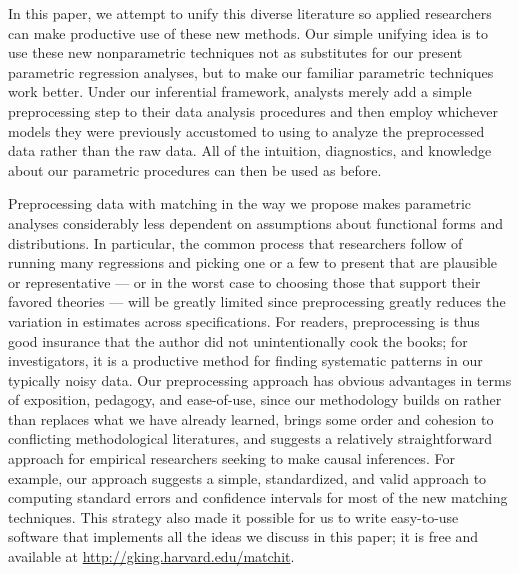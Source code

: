 \documentclass[11pt,titlepage]{article}
\begin{document}
In this paper, we attempt to unify this diverse literature so applied
researchers can make productive use of these new methods.  Our simple
unifying idea is to use these new nonparametric techniques not as
substitutes for our present parametric regression analyses, but to
make our familiar parametric techniques work better.  Under our
inferential framework, analysts merely add a simple preprocessing step
to their data analysis procedures and then employ whichever models
they were previously accustomed to using to analyze the preprocessed
data rather than the raw data.  All of the intuition, diagnostics, and
knowledge about our parametric procedures can then be used as before.

Preprocessing data with matching in the way we propose makes
parametric analyses considerably less dependent on assumptions about
functional forms and distributions.  In particular, the common process
that researchers follow of running many regressions and picking one or
a few to present that are plausible or representative --- or in the
worst case to choosing those that support their favored theories ---
will be greatly limited since preprocessing greatly reduces the
variation in estimates across specifications.  For readers,
preprocessing is thus good insurance that the author did not
unintentionally cook the books; for investigators, it is a productive
method for finding systematic patterns in our typically noisy data.
Our preprocessing approach has obvious advantages in terms of
exposition, pedagogy, and ease-of-use, since our methodology builds on
rather than replaces what we have already learned, brings some order
and cohesion to conflicting methodological literatures, and suggests a
relatively straightforward approach for empirical researchers seeking
to make causal inferences.  For example, our approach suggests a
simple, standardized, and valid approach to computing standard errors
and confidence intervals for most of the new matching techniques.
This strategy also made it possible for us to write easy-to-use
software that implements all the ideas we discuss in this paper; it is
free and available at \url{http://gking.harvard.edu/matchit}.
\end{document}
